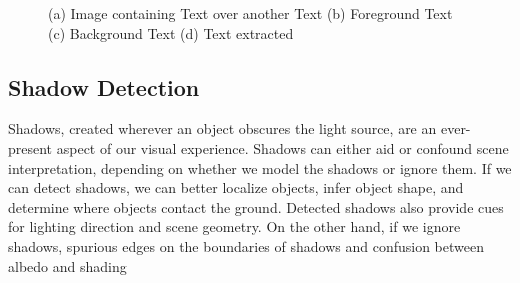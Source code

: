 {{\begin{figure}[htbp]
{}
\caption
{(a) Image containing Text over another Text (b) Foreground Text (c) Background Text (d)
Text extracted}
\label{fig:20}
\end{figure}
\subsection{Shadow Detection}
Shadows, created wherever an object obscures the light
source, are an ever-present aspect of our visual experience.
Shadows can either aid or confound scene interpretation,
depending on whether we model the shadows or ignore
them. If we can detect shadows, we can better localize objects, 
infer object shape, and determine where objects contact the ground. Detected shadows also provide cues for
lighting direction and scene geometry. On the other
hand, if we ignore shadows, spurious edges on the boundaries of shadows and confusion between albedo and shading

}}
